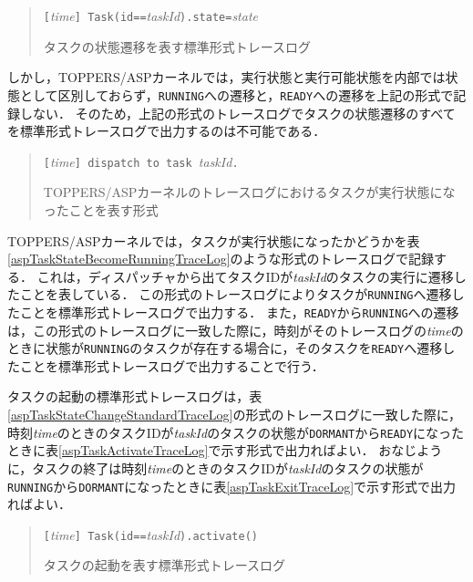 \begin{table}[p]
\begin{quote}
\begin{breakbox}
{\tt [}{\it time}{\tt ] Task(id==}{\it taskId}{\tt ).state=}{\it state}
\end{breakbox}
\caption{タスクの状態遷移を表す標準形式トレースログ}
\label{aspTaskStateChangeStandardTraceLog}
\end{quote}
\end{table}

しかし，TOPPERS/ASPカーネルでは，実行状態と実行可能状態を内部では状態として区別しておらず，{\tt RUNNING}への遷移と，{\tt READY}への遷移を上記の形式で記録しない．
そのため，上記の形式のトレースログでタスクの状態遷移のすべてを標準形式トレースログで出力するのは不可能である．

\begin{table}[p]
\begin{quote}
\begin{breakbox}
{\tt [}{\it time}{\tt ] dispatch to task }{\it taskId}{\tt .}
\end{breakbox}
\caption{TOPPERS/ASPカーネルのトレースログにおけるタスクが実行状態になったことを表す形式}
\label{aspTaskStateBecomeRunningTraceLog}
\end{quote}
\end{table}

TOPPERS/ASPカーネルでは，タスクが実行状態になったかどうかを表\ref{aspTaskStateBecomeRunningTraceLog}のような形式のトレースログで記録する．
これは，ディスパッチャから出てタスクIDが{\it taskId}のタスクの実行に遷移したことを表している．
この形式のトレースログによりタスクが{\tt RUNNING}へ遷移したことを標準形式トレースログで出力する．
また，{\tt READY}から{\tt RUNNING}への遷移は，この形式のトレースログに一致した際に，時刻がそのトレースログの{\it time}のときに状態が{\tt RUNNING}のタスクが存在する場合に，そのタスクを{\tt READY}へ遷移したことを標準形式トレースログで出力することで行う．

タスクの起動の標準形式トレースログは，表\ref{aspTaskStateChangeStandardTraceLog}の形式のトレースログに一致した際に，時刻{\it time}のときのタスクIDが{\it taskId}のタスクの状態が{\tt DORMANT}から{\tt READY}になったときに表\ref{aspTaskActivateTraceLog}で示す形式で出力ればよい．
おなじように，タスクの終了は時刻{\it time}のときのタスクIDが{\it taskId}のタスクの状態が{\tt RUNNING}から{\tt DORMANT}になったときに表\ref{aspTaskExitTraceLog}で示す形式で出力ればよい．

\begin{table}[p]
\begin{quote}
\begin{breakbox}
{\tt [}{\it time}{\tt ] Task(id==}{\it taskId}{\tt ).activate()}
\end{breakbox}
\caption{タスクの起動を表す標準形式トレースログ}
\label{aspTaskActivateTraceLog}
\end{quote}
\end{table}

